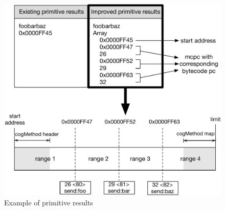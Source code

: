 \documentclass[10pt,preprint,nonatbib]{sigplanconf}
\begin{document}
 \begin{figure}[htp!]
     \begin{center}
         \includegraphics[width=1.0\linewidth]{BytecodeRange}
         \caption{Example of primitive results}
         \label{fig:BytecodeRange}
     \end{center}
 \end{figure}


%
\end{document}
